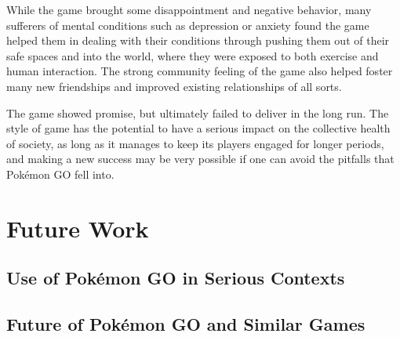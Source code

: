 While the game brought some disappointment and negative behavior, many sufferers of mental conditions such as depression or anxiety found the game helped them in dealing with their conditions through pushing them out of their safe spaces and into the world, where they were exposed to both exercise and human interaction. The strong community feeling of the game also helped foster many new friendships and improved existing relationships of all sorts.

The game showed promise, but ultimately failed to deliver in the long run. The style of game has the potential to have a serious impact on the collective health of society, as long as it manages to keep its players engaged for longer periods, and making a new success may be very possible if one can avoid the pitfalls that Pokémon GO fell into.


\chapter{Future Work}

\section{Use of Pokémon GO in Serious Contexts}


\section{Future of Pokémon GO and Similar Games}

